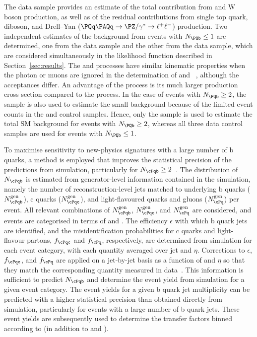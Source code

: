 The \mj data sample provides an estimate of the total contribution
from \ttbar and W boson production, as well as of the residual
contributions from single top quark, diboson, and Drell--Yan
($\PQq\PAQq \to \PZ/\gamma^* \to \ell^+\ell^-$) production. Two
independent estimates of the background from \znunujets events with
$\nb \leq 1$ are determined, one from the \gj data sample and the
other from the \mmj data sample, which are considered simultaneously
in the likelihood function described in Section~\ref{sec:results}. The
\gj and \zmumujets processes have similar kinematic properties when
the photon or muons are ignored in the determination of \ETmiss and
\HTmiss~\cite{Bern:2011pa}, although the acceptances differ. An
advantage of the \gj process is its much larger production cross
section compared to the \znunujets process. In the case of events with
$\nb \geq 2$, the \mj sample is also used to estimate the small
\znunujets background because of the limited event counts in the \mmj
and \gj control samples. Hence, only the \mj sample is used to
estimate the total SM background for events with $\nb \geq 2$, whereas
all three data control samples are used for events with $\nb \leq 1$.

To maximise sensitivity to new-physics signatures with a large number
of b quarks, a method is employed that improves the statistical
precision of the predictions from simulation, particularly for
$N_\cPqb \ge 2$~\cite{RA1Paper2012}. The distribution of $N_\cPqb$ is
estimated from generator-level information contained in the
simulation, namely the number of reconstruction-level jets matched to
underlying b quarks ($N_\cPqb^\text{gen}$), c quarks
($N_\cPqc^\text{gen}$), and light-flavoured quarks and gluons
($N_\cPq^\text{gen}$) per event. All relevant combinations of
$N_\cPqb^\text{gen}$, $N_\cPqc^\text{gen}$, and $N_{\cPq}^\text{gen}$
are considered, and events are categorised in terms of \njet and
\scalht.  The efficiency $\epsilon$ with which b quark jets are
identified, and the misidentification probabilities for c quarks and
light-flavour partons, $f_\cPqc$ and $f_\cPq$, respectively, are
determined from simulation for each event category, with each quantity
averaged over jet \pt and $\eta$. Corrections to $\epsilon$,
$f_\cPqc$, and $f_\cPq$ are applied on a jet-by-jet basis as a
function of \pt and $\eta$ so that they match the corresponding
quantity measured in data~\cite{Chatrchyan:2012jua}. This information
is sufficient to predict $N_\cPqb$ and determine the event yield from
simulation for a given event category. The event yields for a given b
quark jet multiplicity can be predicted with a higher statistical
precision than obtained directly from simulation, particularly for
events with a large number of b quark jets. These event yields are
subsequently used to determine the transfer factors binned according
to \nb (in addition to \njet and \scalht).

